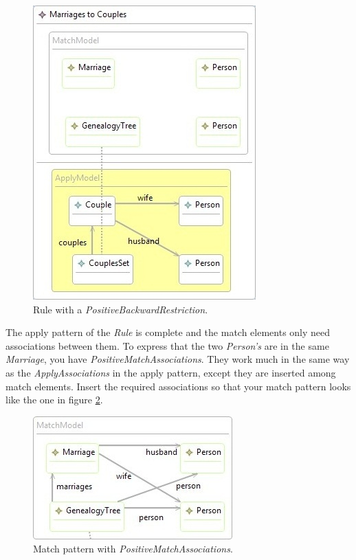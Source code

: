 \begin{figure}[h]
\begin{center}
  \includegraphics[scale=0.7]{imgs/rule_without_match_pattern.jpg}
  \caption{Rule with a \emph{PositiveBackwardRestriction}.}
  \label{fig:rule_without_match_pattern}
\end{center}
\end{figure}

The apply pattern of the \emph{Rule} is complete and the match elements only
need associations between them. To express that the two
\emph{Person's} are in the same \emph{Marriage}, you have
\emph{PositiveMatchAssociations}. They work much in the same way as the
\emph{ApplyAssociations} in the apply pattern, except they are inserted among
match elements. Insert the required associations so that your match pattern
looks like the one in figure \ref{fig:match_pattern_marriages}.

\begin{figure}[h]
\begin{center}
  \includegraphics[scale=0.7]{imgs/match_pattern_marriages.jpg}
  \caption{Match pattern with \emph{PositiveMatchAssociations}.}
  \label{fig:match_pattern_marriages}
\end{center}
\end{figure}

